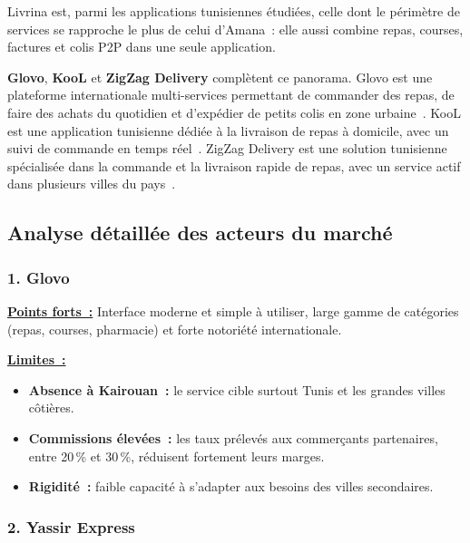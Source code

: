 \documentclass[12pt,fleqn,a4paper]{report}
\begin{document}
\begin{justify}
Livrina est, parmi les applications tunisiennes étudiées, celle dont le périmètre de services se rapproche le plus de celui d'Amana~: elle aussi combine repas, courses, factures et colis P2P dans une seule application.

\vspace{0.3cm}
\noindent\textbf{Glovo}, \textbf{KooL} et \textbf{ZigZag Delivery} complètent ce panorama. Glovo est une plateforme internationale multi-services permettant de commander des repas, de faire des achats du quotidien et d'expédier de petits colis en zone urbaine~\cite{glovo_site}. KooL est une application tunisienne dédiée à la livraison de repas à domicile, avec un suivi de commande en temps réel~\cite{kool_site}. ZigZag Delivery est une solution tunisienne spécialisée dans la commande et la livraison rapide de repas, avec un service actif dans plusieurs villes du pays~\cite{zigzag_site}.

\subsection{Analyse détaillée des acteurs du marché}

\subsubsection*{\Large \textbf{1. Glovo}}
\vspace{0.2cm}

\noindent \textbf{\underline{Points forts~:}}
Interface moderne et simple à utiliser, large gamme de catégories (repas, courses, pharmacie) et forte notoriété internationale.

\vspace{0.2cm}
\noindent \textbf{\underline{Limites~:}}
\begin{itemize}
    \item \textbf{Absence à Kairouan~:} le service cible surtout Tunis et les grandes villes côtières.
    \item \textbf{Commissions élevées~:} les taux prélevés aux commerçants partenaires, entre 20\,\% et 30\,\%, réduisent fortement leurs marges.
    \item \textbf{Rigidité~:} faible capacité à s'adapter aux besoins des villes secondaires.
\end{itemize}

\vspace{0.4cm}

\subsubsection*{\Large \textbf{2. Yassir Express}}
\vspace{0.2cm}


\end{justify}
\end{document}
